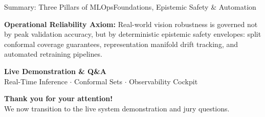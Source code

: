 \documentclass[aspectratio=169,10pt]{beamer}
\begin{document}
\begin{frame}{Summary: Three Pillars of MLOps}{Foundations, Epistemic Safety \& Automation}
    \vspace{0.35cm}
    \begin{card}
        \centering\footnotesize
        \textbf{Operational Reliability Axiom:} Real-world vision robustness is governed not by peak validation accuracy, but by deterministic epistemic safety envelopes: split conformal coverage guarantees, representation manifold drift tracking, and automated retraining pipelines.
    \end{card}
\end{frame}

\begin{frame}[plain]
    \vspace{0.5cm}
    \begin{center}
        {\Huge\bfseries\color{SlateDark} Live Demonstration \& Q\&A}\\[6pt]
        {\large\color{BlueAccent} Real-Time Inference $\cdot$ Conformal Sets $\cdot$ Observability Cockpit}
        
        \vspace{0.6cm}
        
        \vspace{0.8cm}
        {\small\textbf{Thank you for your attention!}}\\[2pt]
        {\footnotesize\color{TextMuted!90} We now transition to the live system demonstration and jury questions.}
    \end{center}
\end{frame}
\end{document}
